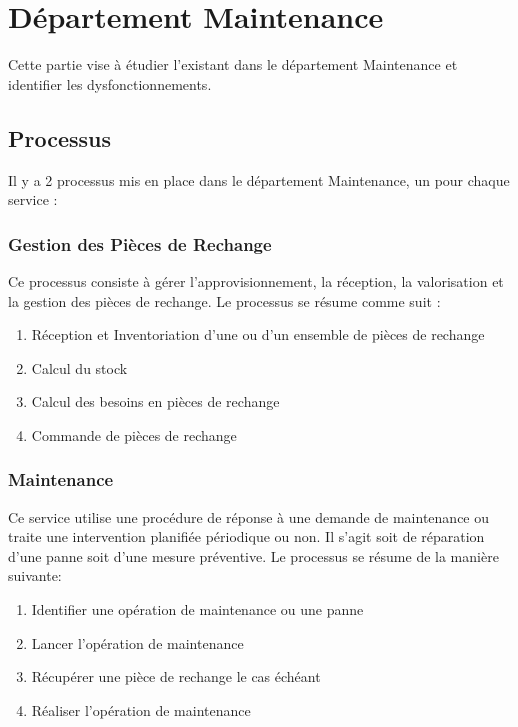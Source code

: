 \section{Département Maintenance}
Cette partie vise à étudier l'existant dans le département Maintenance et
identifier les dysfonctionnements.

\subsection{Processus}
Il y a 2 processus mis en place dans le département Maintenance, un pour chaque
service :
\subsubsection{Gestion des Pièces de Rechange}
Ce processus consiste à gérer l'approvisionnement, la réception, la 
valorisation et la gestion des pièces de rechange.
Le processus se résume comme suit :
\begin{enumerate}
\item Réception et Inventoriation d'une ou d'un ensemble de pièces de rechange
\item Calcul du stock
\item Calcul des besoins en pièces de rechange
\item Commande de pièces de rechange
\end{enumerate}

\subsubsection{Maintenance}
Ce service utilise une procédure de réponse à une demande de maintenance ou
traite une intervention planifiée périodique ou non. Il s'agit soit de 
réparation d'une panne soit d'une mesure préventive.
Le processus se résume de la manière suivante:
\begin{enumerate}
\item Identifier une opération de maintenance ou une panne
\item Lancer l'opération de maintenance
\item Récupérer une pièce de rechange le cas échéant
\item Réaliser l'opération de maintenance
\end{enumerate}

